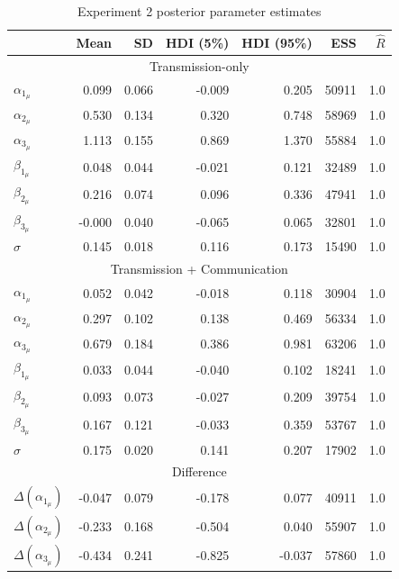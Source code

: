 \documentclass[doc,biblatex]{apa7}
\begin{document}
\begin{table}[h]
\begin{center}
\begin{threeparttable}
\caption{Experiment 2 posterior parameter estimates}
\footnotesize
\begin{tabular}{lrrrrrr}
\toprule
 &   Mean &     SD &  HDI (5\%) &  HDI (95\%) &  ESS &  $\hat{R}$ \\
\midrule
\multicolumn{7}{c}{Transmission-only} \\
$\alpha_{1_\mu}$ &  0.099 &  0.066 &  -0.009 & 0.205 &   50911 &    1.0 \\
$\alpha_{2_\mu}$ &  0.530 &  0.134 &   0.320 & 0.748 &   58969 &    1.0 \\
$\alpha_{3_\mu}$ &  1.113 &  0.155 &   0.869 & 1.370 &   55884 &    1.0 \\
$\beta_{1_\mu}$  &  0.048 &  0.044 &  -0.021 & 0.121 &   32489 &    1.0 \\
$\beta_{2_\mu}$  &  0.216 &  0.074 &   0.096 & 0.336 &   47941 &    1.0 \\
$\beta_{3_\mu}$  & -0.000 &  0.040 &  -0.065 & 0.065 &   32801 &    1.0 \\
$\sigma$         &  0.145 &  0.018 &   0.116 & 0.173 &   15490 &    1.0 \\
\midrule
\multicolumn{7}{c}{Transmission + Communication} \\
$\alpha_{1_\mu}$ &  0.052 &  0.042 &  -0.018 & 0.118 &   30904 &    1.0 \\
$\alpha_{2_\mu}$ &  0.297 &  0.102 &   0.138 & 0.469 &   56334 &    1.0 \\
$\alpha_{3_\mu}$ &  0.679 &  0.184 &   0.386 & 0.981 &   63206 &    1.0 \\
$\beta_{1_\mu}$  &  0.033 &  0.044 &  -0.040 & 0.102 &   18241 &    1.0 \\
$\beta_{2_\mu}$  &  0.093 &  0.073 &  -0.027 & 0.209 &   39754 &    1.0 \\
$\beta_{3_\mu}$  &  0.167 &  0.121 &  -0.033 & 0.359 &   53767 &    1.0 \\
$\sigma$         &  0.175 &  0.020 &   0.141 & 0.207 &   17902 &    1.0 \\
\midrule
\multicolumn{7}{c}{Difference} \\
$\Delta(\alpha_{1_\mu})$ & -0.047 &  0.079 &  -0.178 &    0.077 &   40911 &    1.0 \\
$\Delta(\alpha_{2_\mu})$ & -0.233 &  0.168 &  -0.504 &    0.040 &   55907 &    1.0 \\
$\Delta(\alpha_{3_\mu})$ & -0.434 &  0.241 &  -0.825 &   -0.037 &   57860 &    1.0 \\

\end{tabular}
\end{threeparttable}
\end{center}
\end{table}
\end{document}
